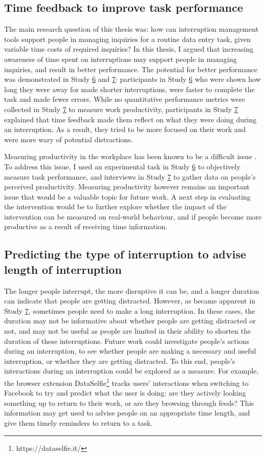 \subsection{Time feedback to improve task performance}
The main research question of this thesis was: how can interruption management tools support people in managing inquiries for a routine data entry task, given variable time costs of required inquiries? In this thesis, I argued that increasing awareness of time spent on interruptions may support people in managing inquiries, and result in better performance. 
The potential for better performance was demonstrated in Study \hyperref[st:Study6]{6} and \hyperref[st:Study7]{7}: participants in Study \hyperref[st:Study6]{6} who were shown how long they were away for made shorter interruptions, were faster to complete the task and made fewer errors. While no quantitative performance metrics were collected in Study \hyperref[st:Study7]{7} to measure work productivity, participants in Study \hyperref[st:Study7]{7} explained that time feedback made them reflect on what they were doing during an interruption. As a result, they tried to be more focused on their work and were more wary of potential distractions.

Measuring productivity in the workplace has been known to be a difficult issue \citep{Mark2015}. To address this issue, I used an experimental task in Study \hyperref[st:Study6]{6} to objectively measure task performance, and interviews in Study \hyperref[st:Study7]{7} to gather data on people’s perceived productivity. Measuring productivity however remains an important issue that would be a valuable topic for future work. A next step in evaluating the intervention would be to further explore whether the impact of the intervention can be measured on real-world behaviour, and if people become more productive as a result of receiving time information. 

\subsection{Predicting the type of interruption to advise length of interruption}
The longer people interrupt, the more disruptive it can be, and a longer duration can indicate that people are getting distracted. However, as became apparent in Study \hyperref[st:Study7]{7}, sometimes people need to make a long interruption. In these cases, the duration may not be informative about whether people are getting distracted or not, and may not be useful as people are limited in their ability to shorten the duration of these interruptions. Future work could investigate people's actions during an interruption, to see whether people are making a necessary and useful interruption, or whether they are getting distracted. To this end, people's interactions during an interruption could be explored as a measure. For example, the browser extension DataSelfie\footnote{https://dataselfie.it/} tracks users' interactions when switching to Facebook to try and predict what the user is doing: are they actively looking something up to return to their work, or are they browsing through feeds? This information may get used to advise people on an appropriate time length, and give them timely reminders to return to a task. 

